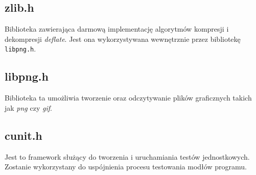 \documentclass{article}
\begin{document}
\subsection{zlib.h}
Biblioteka zawierająca darmową implementację algorytmów kompresji i dekompresji \textit{deflate}. Jest ona wykorzystywana wewnętrznie przez bibliotekę \texttt{libpng.h}.

\subsection{libpng.h}
Biblioteka ta umożliwia tworzenie oraz odczytywanie plików graficznych takich jak \textit{png} czy \textit{gif}.

\subsection{cunit.h}
Jest to framework służący do tworzenia i uruchamiania testów jednostkowych. Zostanie wykorzystany do uspójnienia procesu testowania modłów programu.
\end{document}
